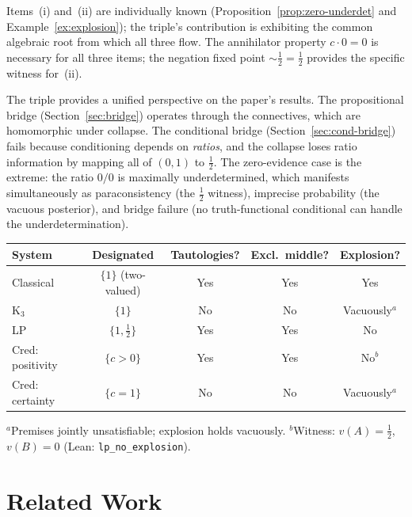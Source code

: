 \documentclass[11pt,a4paper]{article}
\newcommand{\negc}{\mathord{\sim}}
\begin{document}
Items~(i) and~(ii) are individually known
(Proposition~\ref{prop:zero-underdet} and
Example~\ref{ex:explosion}); the triple's contribution is
exhibiting the common algebraic root from which all three flow.
The annihilator property $c \cdot 0 = 0$ is necessary for all
three items; the negation fixed point $\negc \tfrac{1}{2}
= \tfrac{1}{2}$ provides the specific witness for~(ii).

The triple provides a unified perspective on the paper's results.
The propositional bridge (Section~\ref{sec:bridge}) operates through
the connectives, which are homomorphic under collapse.
The conditional bridge (Section~\ref{sec:cond-bridge}) fails because
conditioning depends on \emph{ratios}, and the collapse loses ratio
information by mapping all of $(0,1)$ to $\tfrac{1}{2}$.
The zero-evidence case is the extreme: the ratio $0/0$ is maximally
underdetermined, which manifests simultaneously as paraconsistency
(the $\tfrac{1}{2}$ witness), imprecise probability (the vacuous
posterior), and bridge failure (no truth-functional conditional can
handle the underdetermination).

\begin{center}
\small
\begin{tabular}{lcccc}
\toprule
\textbf{System} & \textbf{Designated} & \textbf{Tautologies?}
  & \textbf{Excl.\ middle?} & \textbf{Explosion?} \\
\midrule
Classical & $\{1\}$ (two-valued) & Yes & Yes & Yes \\
K$_3$ & $\{1\}$ & No & No & Vacuously$^a$ \\
LP & $\{1, \tfrac{1}{2}\}$ & Yes & Yes & No \\
Cred: positivity & $\{c > 0\}$ & Yes & Yes & No$^b$ \\
Cred: certainty & $\{c = 1\}$ & No & No & Vacuously$^a$ \\
\bottomrule
\end{tabular}
\normalsize
\end{center}
\smallskip
\noindent
{\footnotesize
$^a$Premises jointly unsatisfiable; explosion holds vacuously.
$^b$Witness: $v(A) = \tfrac{1}{2}$, $v(B) = 0$
(Lean: \texttt{lp\_no\_explosion}).}

\section{Related Work}
\label{sec:related}
\end{document}
